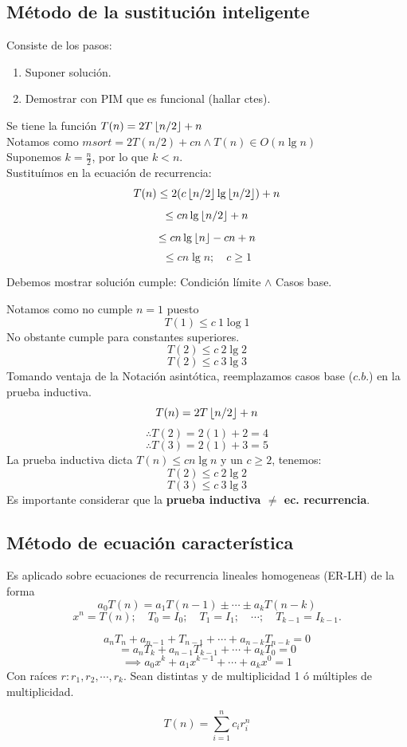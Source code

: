 \documentclass[tikz,11pt,fleqn]{book} %
\begin{document}
\subsection{Método de la sustitución inteligente}
Consiste de los pasos:
\begin{enumerate}
    \item Suponer solución.
    \item Demostrar con PIM que es funcional (hallar ctes).
\end{enumerate}

\begin{example}

    Se tiene la función $T(n)=2T\left\lfloor n/2 \right\rfloor+n$\\
    Notamos como $msort=2T(n/2)+cn\land T(n)\in O(n\lg n)$\\
    Suponemos $k=\frac n2$, por lo que $k<n$.\\
    Sustituímos en la ecuación de recurrencia:
    $$ T(n)\le 2(c\left\lfloor n/2 \right\rfloor\lg \left\lfloor n/2 \right\rfloor)+n $$
    $$ \le cn\lg \left\lfloor n/2 \right\rfloor+n$$
    $$ \le cn\lg \left\lfloor n \right\rfloor-cn+n$$
    $$ \le cn\lg n;\quad c\ge1$$

    Debemos mostrar solución cumple: Condición límite $\land$ Casos base.  
    
    Notamos como no cumple $n=1$ puesto
    $$ T(1)\le c~1\log 1 $$
    No obstante cumple para constantes superiores.
    $$ T(2)\le c~2\lg 2 $$$$
    T(2)\le c~3\lg 3 $$
    Tomando ventaja de la Notación asintótica, reemplazamos casos base ($c.b.$) en la prueba inductiva.
    $$ T(n)=2T\left\lfloor n/2 \right\rfloor+n $$$$
        \therefore T(2)=2(1)+2=4 $$$$
        \therefore T(3)=2(1)+3=5
    $$
    La prueba inductiva dicta $T(n)\le cn\lg n$ y un $c\ge2$, tenemos:
    $$
        T(2)\le c~2\lg 2    $$ $$
        T(3)\le c~3\lg 3
    $$
    Es importante considerar que la \textbf{prueba inductiva $\ne$ ec. recurrencia}.
\end{example}



\subsection{Método de ecuación característica}
Es aplicado sobre ecuaciones de recurrencia lineales homogeneas (ER-LH) de la forma
$$ a_0T(n)=a_1T(n-1)\pm\cdots\pm a_kT(n-k) $$
$$ x^n=T(n);\quad T_0=I_0;\quad T_1=I_1;\quad\cdots;\quad T_{k-1}=I_{k-1}.$$
\begin{definition}
    $$a_nT_n+a_{n-1}+T_{n-1}+\cdots+a_{n-k}T_{n-k}=0$$
    $$ =a_nT_k+a_{n-1}T_{k-1}+\cdots+a_kT_0=0 $$
    $$ \implies a_0x^k+a_1x^{k-1}+\cdots+a_kx^0=1 $$
    Con raíces $r:r_1,r_2,\cdots,r_k$.
    Sean distintas y de multiplicidad 1 ó múltiples de multiplicidad.
    \begin{theorem}[Mult. = 1]
        $$T(n)=\sum_{i=1}^n c_ir_i^n$$
    \end{theorem}
\end{definition}
\end{document}

